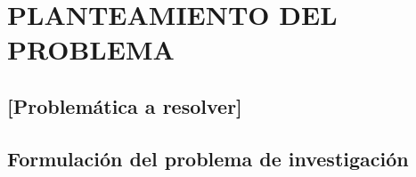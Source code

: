 \chapter{PLANTEAMIENTO DEL PROBLEMA}
		\section{[Problemática a resolver]}		
		\section{Formulación del problema de investigación}
		
		